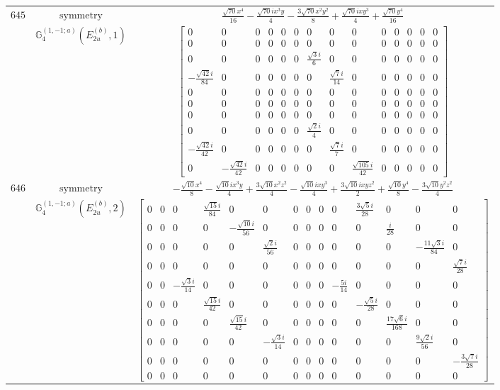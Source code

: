 \documentclass[fleqn,8pt,landscape]{jsarticle}
\begin{document}
\begin{longtable}{ccc}
$ 645 $ & $ \text{symmetry} $ & $ \frac{\sqrt{70} x^{4}}{16} - \frac{\sqrt{70} i x^{3} y}{4} - \frac{3 \sqrt{70} x^{2} y^{2}}{8} + \frac{\sqrt{70} i x y^{3}}{4} + \frac{\sqrt{70} y^{4}}{16} $ \\
$  $ & $ \mathbb{G}_{4}^{(1,-1;a)}(E_{2u}^{(b)},1) $ & $ \begin{bmatrix} 0 & 0 & 0 & 0 & 0 & 0 & 0 & 0 & 0 & 0 & 0 & 0 & 0 & 0 \\ 0 & 0 & 0 & 0 & 0 & 0 & 0 & 0 & 0 & 0 & 0 & 0 & 0 & 0 \\ 0 & 0 & 0 & 0 & 0 & 0 & \frac{\sqrt{3} i}{6} & 0 & 0 & 0 & 0 & 0 & 0 & 0 \\ - \frac{\sqrt{42} i}{84} & 0 & 0 & 0 & 0 & 0 & 0 & \frac{\sqrt{7} i}{14} & 0 & 0 & 0 & 0 & 0 & 0 \\ 0 & 0 & 0 & 0 & 0 & 0 & 0 & 0 & 0 & 0 & 0 & 0 & 0 & 0 \\ 0 & 0 & 0 & 0 & 0 & 0 & 0 & 0 & 0 & 0 & 0 & 0 & 0 & 0 \\ 0 & 0 & 0 & 0 & 0 & 0 & 0 & 0 & 0 & 0 & 0 & 0 & 0 & 0 \\ 0 & 0 & 0 & 0 & 0 & 0 & \frac{\sqrt{2} i}{4} & 0 & 0 & 0 & 0 & 0 & 0 & 0 \\ - \frac{\sqrt{42} i}{42} & 0 & 0 & 0 & 0 & 0 & 0 & \frac{\sqrt{7} i}{7} & 0 & 0 & 0 & 0 & 0 & 0 \\ 0 & - \frac{\sqrt{42} i}{42} & 0 & 0 & 0 & 0 & 0 & 0 & \frac{\sqrt{105} i}{42} & 0 & 0 & 0 & 0 & 0 \end{bmatrix} $ \\ \hline
$ 646 $ & $ \text{symmetry} $ & $ - \frac{\sqrt{10} x^{4}}{8} - \frac{\sqrt{10} i x^{3} y}{4} + \frac{3 \sqrt{10} x^{2} z^{2}}{4} - \frac{\sqrt{10} i x y^{3}}{4} + \frac{3 \sqrt{10} i x y z^{2}}{2} + \frac{\sqrt{10} y^{4}}{8} - \frac{3 \sqrt{10} y^{2} z^{2}}{4} $ \\
$  $ & $ \mathbb{G}_{4}^{(1,-1;a)}(E_{2u}^{(b)},2) $ & $ \begin{bmatrix} 0 & 0 & 0 & \frac{\sqrt{15} i}{84} & 0 & 0 & 0 & 0 & 0 & 0 & \frac{3 \sqrt{5} i}{28} & 0 & 0 & 0 \\ 0 & 0 & 0 & 0 & - \frac{\sqrt{10} i}{56} & 0 & 0 & 0 & 0 & 0 & 0 & \frac{i}{28} & 0 & 0 \\ 0 & 0 & 0 & 0 & 0 & \frac{\sqrt{2} i}{56} & 0 & 0 & 0 & 0 & 0 & 0 & - \frac{11 \sqrt{3} i}{84} & 0 \\ 0 & 0 & 0 & 0 & 0 & 0 & 0 & 0 & 0 & 0 & 0 & 0 & 0 & \frac{\sqrt{7} i}{28} \\ 0 & 0 & - \frac{\sqrt{3} i}{14} & 0 & 0 & 0 & 0 & 0 & 0 & - \frac{5 i}{14} & 0 & 0 & 0 & 0 \\ 0 & 0 & 0 & \frac{\sqrt{15} i}{42} & 0 & 0 & 0 & 0 & 0 & 0 & - \frac{\sqrt{5} i}{28} & 0 & 0 & 0 \\ 0 & 0 & 0 & 0 & \frac{\sqrt{15} i}{42} & 0 & 0 & 0 & 0 & 0 & 0 & \frac{17 \sqrt{6} i}{168} & 0 & 0 \\ 0 & 0 & 0 & 0 & 0 & - \frac{\sqrt{3} i}{14} & 0 & 0 & 0 & 0 & 0 & 0 & \frac{9 \sqrt{2} i}{56} & 0 \\ 0 & 0 & 0 & 0 & 0 & 0 & 0 & 0 & 0 & 0 & 0 & 0 & 0 & - \frac{3 \sqrt{7} i}{28} \\ 0 & 0 & 0 & 0 & 0 & 0 & 0 & 0 & 0 & 0 & 0 & 0 & 0 & 0 \end{bmatrix} $ \\ \hline

\end{longtable}
\end{document}
